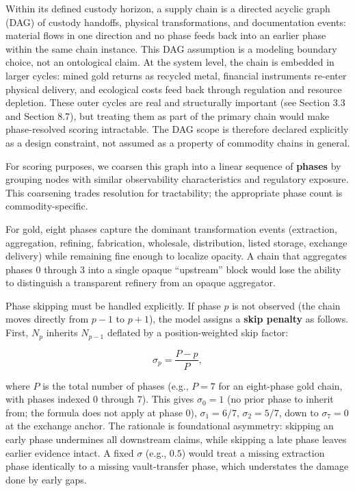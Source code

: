 \documentclass[
  11pt,
  letterpaper,
]{article}
\begin{document}
Within its defined custody horizon, a supply chain is a directed acyclic
graph (DAG) of custody handoffs, physical transformations, and
documentation events: material flows in one direction and no phase feeds
back into an earlier phase within the same chain instance. This DAG
assumption is a modeling boundary choice, not an ontological claim. At
the system level, the chain is embedded in larger cycles: mined gold
returns as recycled metal, financial instruments re-enter physical
delivery, and ecological costs feed back through regulation and resource
depletion. These outer cycles are real and structurally important (see
Section 3.3 and Section 8.7), but treating them as part of the primary
chain would make phase-resolved scoring intractable. The DAG scope is
therefore declared explicitly as a design constraint, not assumed as a
property of commodity chains in general.

For scoring purposes, we coarsen this graph into a linear sequence of
\textbf{phases} by grouping nodes with similar observability
characteristics and regulatory exposure. This coarsening trades
resolution for tractability; the appropriate phase count is
commodity-specific.

For gold, eight phases capture the dominant transformation events
(extraction, aggregation, refining, fabrication, wholesale,
distribution, listed storage, exchange delivery) while remaining fine
enough to localize opacity. A chain that aggregates phases 0 through 3
into a single opaque ``upstream'' block would lose the ability to
distinguish a transparent refinery from an opaque aggregator.

Phase skipping must be handled explicitly. If phase \(p\) is not
observed (the chain moves directly from \(p-1\) to \(p+1\)), the model
assigns a \textbf{skip penalty} as follows. First, \(N_p\) inherits
\(N_{p-1}\) deflated by a position-weighted skip factor:

\[\sigma_p = \frac{P - p}{P},\]

where \(P\) is the total number of phases (e.g., \(P = 7\) for an
eight-phase gold chain, with phases indexed \(0\) through \(7\)). This
gives \(\sigma_0 = 1\) (no prior phase to inherit from; the formula does
not apply at phase 0), \(\sigma_1 = 6/7\), \(\sigma_2 = 5/7\), down to
\(\sigma_7 = 0\) at the exchange anchor. The rationale is foundational
asymmetry: skipping an early phase undermines all downstream claims,
while skipping a late phase leaves earlier evidence intact. A fixed
\(\sigma\) (e.g., \(0.5\)) would treat a missing extraction phase
identically to a missing vault-transfer phase, which understates the
damage done by early gaps.
\end{document}
